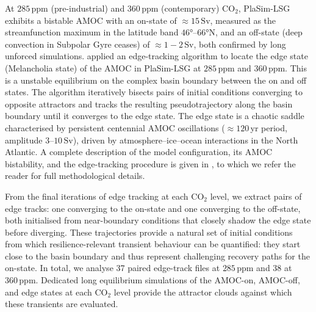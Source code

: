 \documentclass[12pt, a4paper]{article}
\newcommand{\Sv}{\,\text{Sv}}    %
\newcommand{\CO}{CO\ensuremath{_2}}
\begin{document}
At $285\,\text{ppm}$ (pre-industrial) and $360\,\text{ppm}$ (contemporary) \CO{}, PlaSim-LSG exhibits a bistable AMOC with an on-state of $\approx 15\Sv{}$, measured as the streamfunction maximum in the latitude band $46°$--$66°\text{N}$, and an off-state (deep convection in Subpolar Gyre ceases) of $\approx 1-2\Sv{}$, both confirmed by long unforced simulations. \citet{Borner2026GlobalStabilityAtlantic} applied an edge-tracking algorithm \citep{Lucarini2017EdgeTracking} to locate the edge state (Melancholia state) of the AMOC in PlaSim-LSG at $285\,\text{ppm}$ and $360\,\text{ppm}$. This is a unstable equilibrium on the complex basin boundary between the on and off states. The algorithm iteratively bisects pairs of initial conditions converging to opposite attractors and tracks the resulting pseudotrajectory along the basin boundary until it converges to the edge state. The edge state is a chaotic saddle characterised by persistent centennial AMOC oscillations ($\approx 120$\,yr period, amplitude $3$–$10\Sv{}$), driven by atmosphere–ice–ocean interactions in the North Atlantic. A complete description of the model configuration, its AMOC bistability, and the edge-tracking procedure is given in \citet{Borner2026GlobalStabilityAtlantic}, to which we refer the reader for full methodological details.

From the final iterations of edge tracking at each \CO{} level, we extract pairs of edge tracks: one converging to the on-state and one converging to the off-state, both initialised from near-boundary conditions that closely shadow the edge state before diverging. These trajectories provide a natural set of initial conditions from which resilience-relevant transient behaviour can be quantified: they start close to the basin boundary and thus represent challenging recovery paths for the on-state. In total, we analyse 37 paired edge-track files at $285\,\text{ppm}$ and 38 at $360\,\text{ppm}$. Dedicated long equilibrium simulations of the AMOC-on, AMOC-off, and edge states at each \CO{} level provide the attractor clouds against which these transients are evaluated.
\end{document}
